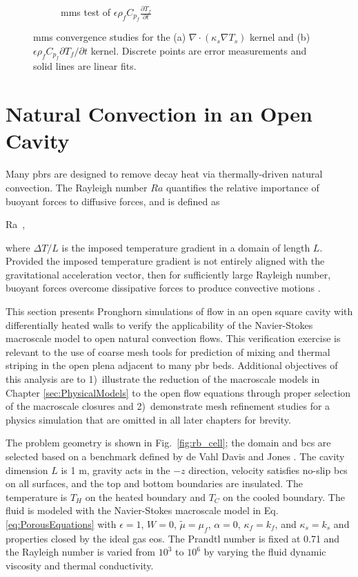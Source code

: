 \begin{figure}[!h]
\begin{subfigure}{0.48\linewidth}
        \caption{\gls{mms} test of \(\epsilon\rho_fC_{p_f}\frac{\partial T_f}{\partial t}\)}
    \end{subfigure}
    \caption{\gls{mms} convergence studies for the (a) \(\nabla\cdot(\kappa_s\nabla T_s)\) kernel and (b) \(\epsilon\rho_fC_{p_f}\partial T_f/\partial t\) kernel. Discrete points are error measurements and solid lines are linear fits.}
    \label{fig:convergence}
\end{figure}

\section{Natural Convection in an Open Cavity}
\label{sec:natural_convection}

Many \glspl{pbr} are designed to remove decay heat via thermally-driven natural convection. The Rayleigh number \(Ra\) quantifies the relative importance of buoyant forces to diffusive forces, and is defined as

\beq
\label{eq:RaDef}
Ra\equiv{}\ ,
\eeq

\noindent where \(\Delta T/L\) is the imposed temperature gradient in a domain of length \(L\). Provided the imposed temperature gradient is not entirely aligned with the gravitational acceleration vector, then for sufficiently large Rayleigh number, buoyant forces overcome dissipative forces to produce convective motions \cite{manneville,sandberg}.

This section presents Pronghorn simulations of flow in an open square cavity with differentially heated walls to verify the applicability of the Navier-Stokes macroscale model to open natural convection flows. This verification exercise is relevant to the use of coarse mesh tools for prediction of mixing and thermal striping in the open plena adjacent to many \gls{pbr} beds. Additional objectives of this analysis are to 1)~illustrate the reduction of the macroscale models in Chapter \ref{sec:PhysicalModels} to the open flow equations through proper selection of the macroscale closures and 2)~demonstrate mesh refinement studies for a physics simulation that are omitted in all later chapters for brevity.

The problem geometry is shown in Fig.\ \ref{fig:rb_cell}; the domain and \glspl{bc} are selected based on a benchmark defined by de Vahl Davis and Jones \cite{davis}. The cavity dimension \(L\) is 1 \si{\meter}, gravity acts in the \(-z\) direction, velocity satisfies no-slip \glspl{bc} on all surfaces, and the top and bottom boundaries are insulated. The temperature is \(T_H\) on the heated boundary and \(T_C\) on the cooled boundary. The fluid is modeled with the Navier-Stokes macroscale model in Eq. \eqref{eq:PorousEquations} with \(\epsilon=1\), \(W=0\), \(\tilde{\mu}=\mu_f\), \(\alpha=0\), \(\kappa_f=k_f\), and \(\kappa_s=k_s\) and properties closed by the ideal gas \gls{eos}. The Prandtl number is fixed at 0.71 and the Rayleigh number is varied from \(10^3\) to \(10^6\) by varying the fluid dynamic viscosity and thermal conductivity.

